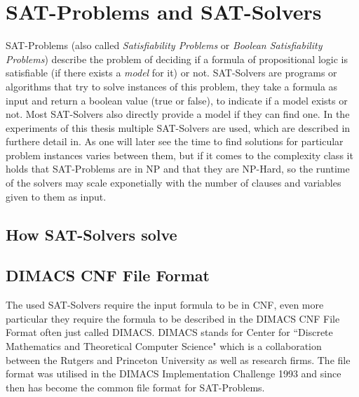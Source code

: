 \newpage
\section{SAT-Problems and SAT-Solvers}
SAT-Problems (also called \emph{Satisfiability Problems} or \emph{Boolean Satisfiability Problems}) describe the problem of deciding if a formula of propositional logic is satisfiable (if there exists a \emph{model} for it) or not. SAT-Solvers are programs or algorithms that try to solve instances of this problem, they take a formula as input and return a boolean value (true or false), to indicate if a model exists or not. Most SAT-Solvers also directly provide a model if they can find one. In the experiments of this thesis multiple SAT-Solvers are used, which are described in furthere detail in. As one will later see the time to find solutions for particular problem instances varies between them, but if it comes to the complexity class it holds that SAT-Problems are in NP and that they are NP-Hard\cite{10.1145/800157.805047}\cite{levin1973universal}, so the runtime of the solvers may scale exponetially with the number of clauses and variables given to them as input.


\subsection{How SAT-Solvers solve}

\subsection{DIMACS CNF File Format}
The used SAT-Solvers require the input formula to be in CNF, even more particular they require the formula to be described in the DIMACS CNF File Format often just called DIMACS. DIMACS stands for Center for ``Discrete Mathematics and Theoretical Computer Science" which is a collaboration between the Rutgers and Princeton University as well as research firms. The file format was utilised in the DIMACS Implementation Challenge 1993 and since then has become the common file format for SAT-Problems.\\

